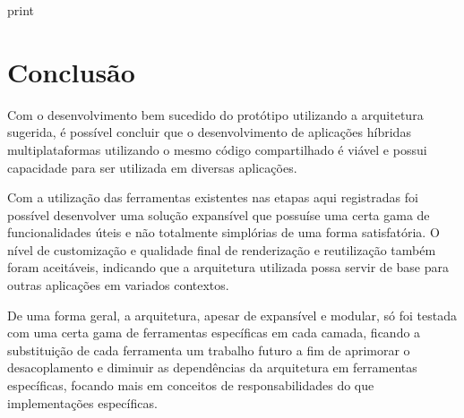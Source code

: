 print

\section{\esp Conclusão}

Com o desenvolvimento bem sucedido do protótipo utilizando a arquitetura sugerida, é possível concluir que o desenvolvimento de aplicações híbridas multiplataformas utilizando o mesmo código compartilhado é viável e possui capacidade para ser utilizada em diversas aplicações.

Com a utilização das ferramentas existentes nas etapas aqui registradas foi possível desenvolver uma solução expansível que possuíse uma certa gama de funcionalidades úteis e não totalmente simplórias de uma forma satisfatória. O nível de customização e qualidade final de renderização e reutilização também foram aceitáveis, indicando que a arquitetura utilizada possa servir de base para outras aplicações em variados contextos.

De uma forma geral, a arquitetura, apesar de expansível e modular, só foi testada com uma certa gama de ferramentas específicas em cada camada, ficando a substituição de cada ferramenta um trabalho futuro a fim de aprimorar o desacoplamento e diminuir as dependências da arquitetura em ferramentas específicas, focando mais em conceitos de responsabilidades do que implementações específicas.

